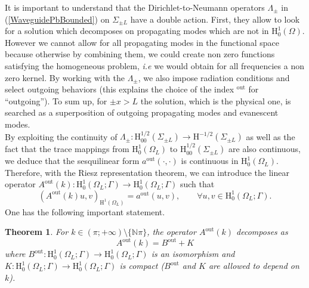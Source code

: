 \documentclass[11pt,a4paper]{report}
\newcommand{\Om}{\Omega}
\newcommand{\mrm}[1]{\mathrm{#1}}
\newcommand{\N}{\mathbb{N}}
\newcommand{\mH}{\mrm{H}}
\newtheorem{theorem}{Theorem}[chapter]
\begin{document}
It is important to understand that the Dirichlet-to-Neumann operators $\Lambda_\pm$ in (\ref{WaveguidePbBounded}) on $\Sigma_{\pm L}$ have a double action. First, they allow to look for a solution which decomposes on propagating modes which are not in $\mH^1_0(\Om)$. However we cannot allow for all propagating modes in the functional space because otherwise by combining them, we could create non zero functions satisfying the homogeneous problem, \textit{i.e} we would obtain for all frequencies a non zero kernel. By working with the $\Lambda_\pm$, we also impose   radiation conditions and select outgoing behaviors (this explains the choice of the index ${}^{\mrm{out}}$ for ``outgoing''). To sum up, for $\pm x>L$ the solution, which is the physical one, is searched as a superposition of outgoing propagating modes and evanescent modes.\\
\newline
By exploiting the continuity of $\Lambda_\pm: \mH^{1/2}_{00}(\Sigma_{\pm L})  \to \mH^{-1/2}(\Sigma_{\pm L})$ as well as the fact that the trace mappings from $\mH^1_0(\Om_L)$ to $\mH^{1/2}_{00}(\Sigma_{\pm L})$ are also continuous, we deduce that the sesquilinear form $a^{\mrm{out}}(\cdot,\cdot)$ is continuous in $\mH^1_0(\Om_L)$. Therefore, with the Riesz representation theorem, we can introduce the linear operator $A^{\mrm{out}}(k):\mH^1_0(\Om_L;\Gamma)\to\mH^1_0(\Om_L;\Gamma)$ such that
\begin{equation}\label{DefOpAkOut}
(A^{\mrm{out}}(k)u,v)_{\mH^1(\Om_L)} =a^{\mrm{out}}(u,v),\qquad\forall u,v\in \mH^1_0(\Om_L;\Gamma).
\end{equation}
One has the following important statement.
\begin{theorem}\label{ThmFredholm}
For $k\in(\pi;+\infty)\setminus\{\N\pi\}$, the operator $A^{\mrm{out}}(k)$ decomposes as 
\[
A^{\mrm{out}}(k)=B^{\mrm{out}}+K
\]
where $B^{\mrm{out}}:\mH^1_0(\Om_L;\Gamma)\to\mH^1_0(\Om_L;\Gamma)$ is an isomorphism and $K:\mH^1_0(\Om_L;\Gamma)\to\mH^1_0(\Om_L;\Gamma)$ is compact ($B^{\mrm{out}}$ and $K$ are allowed to depend on $k$).
\end{theorem}
\end{document}
